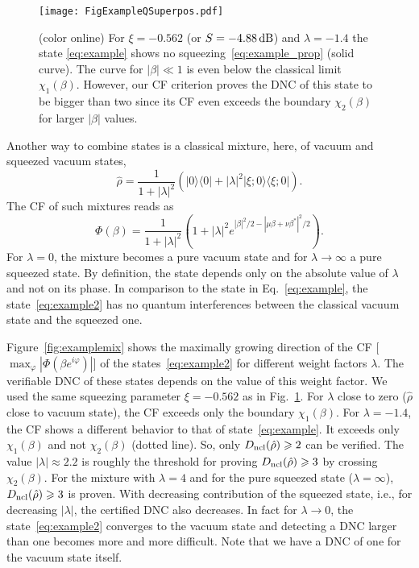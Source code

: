 \documentclass[aps,pra,twocolumn,showpacs,superscriptaddress,10pt]{revtex4-1}
\begin{document}
\begin{figure}[ht]
	\texttt{[image: FigExampleQSuperpos.pdf]}
	\caption{(color online)
		For $\xi=-0.562$ (or $S=-4.88\,{\rm dB}$) and $\lambda=-1.4$ the state \eqref{eq:example} shows no squeezing~\eqref{eq:example_prop} (solid curve).
		The curve for $|\beta|\ll1$ is even below the classical limit $\chi_1(\beta)$.
		However, our CF criterion proves the DNC of this state to be bigger than two since its CF even exceeds the boundary $\chi_2(\beta)$ for larger $|\beta|$ values.%
	}\label{fig:example2}
\end{figure}

	Another way to combine states is a classical mixture, here, of vacuum and squeezed vacuum states,
 	\begin{equation}
		\hat{\rho}=\frac{1}{1+|\lambda|^2}(|0\rangle\langle0|+|\lambda|^2|\xi;0\rangle\langle\xi;0|).\label{eq:example2}
 	\end{equation}
	The CF of such mixtures reads as
	\begin{equation}
		\Phi(\beta)=\frac{1}{1+|\lambda|^2}\left(1+|\lambda|^2e^{|\beta|^2/2-|\mu\beta+\nu\beta^{\ast}|^2/2}\right).
	\end{equation}
	For $\lambda=0$, the mixture becomes a pure vacuum state and for $\lambda\to\infty$ a pure squeezed state.
	By definition, the state depends only on the absolute value of $\lambda$ and not on its phase.
	In comparison to the state in Eq.~\eqref{eq:example}, the state~\eqref{eq:example2} has no quantum interferences between the classical vacuum state and the squeezed one.
	
	Figure~\ref{fig:examplemix} shows the maximally growing direction of the CF [$\max_\varphi |\Phi(\beta e^{i\varphi})|$] of the states~\eqref{eq:example2} for different weight factors $\lambda$.
	The verifiable DNC of these states depends on the value of this weight factor.
	We used the same squeezing parameter $\xi=-0.562$ as in Fig.~\ref{fig:example2}.
	For $\lambda$ close to zero ($\hat\rho$ close to vacuum state), the CF exceeds only the boundary $\chi_1(\beta)$.
	For $\lambda=-1.4$, the CF shows a different behavior to that of state~\eqref{eq:example}.
	It exceeds only $\chi_1(\beta)$ and not $\chi_2(\beta)$ (dotted line).
	So, only $D_{\rm ncl}(\hat\rho)\geqslant 2$ can be verified.
	The value $|\lambda|\approx2.2$ is roughly the threshold for proving $D_{\rm ncl}(\hat\rho)\geqslant3$ by crossing $\chi_2(\beta)$. 
	For the mixture with $\lambda=4$ and for the pure squeezed state ($\lambda=\infty$), $D_{\rm ncl}(\hat\rho)\geqslant 3$ is proven.
	With decreasing contribution of the squeezed state, i.e., for decreasing $|\lambda|$, the certified DNC also decreases.
	In fact for $\lambda\to0$, the state~\eqref{eq:example2} converges to the vacuum state and detecting a DNC larger than one becomes more and more difficult.
	Note that we have a DNC of one for the vacuum state itself.
\end{document}
